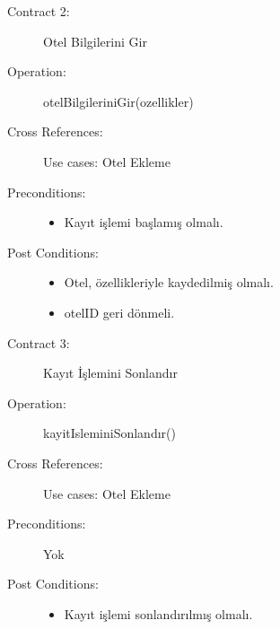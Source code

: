 \documentclass[12pt,a4paper]{report}
\begin{document}
\begin{description}
\item[Contract 2:] Otel Bilgilerini Gir
\item[Operation:] otelBilgileriniGir(ozellikler)
\item[Cross References:] Use cases: Otel Ekleme
\item[Preconditions:] \hspace{10 mm}
\begin{itemize}
\item Kayıt işlemi başlamış olmalı.
\end{itemize}
\item[Post Conditions:] \hspace{10 mm}
\begin{itemize} 
\item Otel, özellikleriyle kaydedilmiş olmalı.
\item otelID geri dönmeli. \\
\end{itemize}
\end{description}

\begin{description}
\item[Contract 3:] Kayıt İşlemini Sonlandır
\item[Operation:] kayitIsleminiSonlandır()
\item[Cross References:] Use cases: Otel Ekleme
\item[Preconditions:] Yok
\item[Post Conditions:] \hspace{10 mm}
\begin{itemize} 
\item Kayıt işlemi sonlandırılmış olmalı. \\
\end{itemize}
\end{description}
\end{document}
